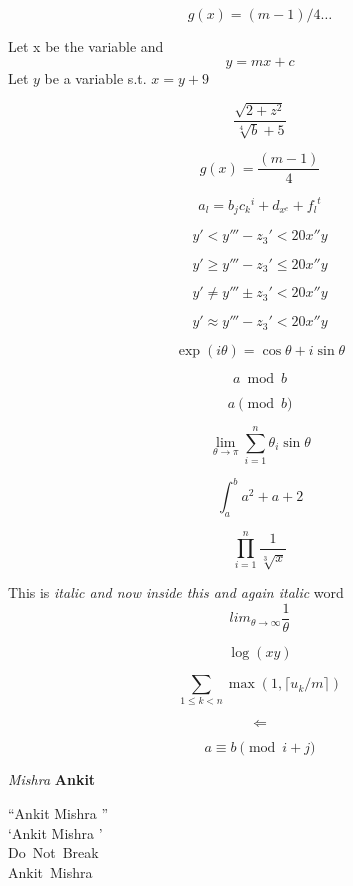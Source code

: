 \documentclass[12pt]{article}
\begin{document}
\begin{equation}
g(x)=(m-1)/4 \ldots
\end{equation}

Let x be the variable and 
$$y=mx+c$$
Let $y$ be a variable s.t. \(x=y+9\)


$$\frac{\sqrt{2+z^2}}{\sqrt[4]{b}+5}$$

$$g(x)=\frac{(m-1)}{4}$$

$$a_l={b_j}{{c_k}^i} + d_{x^e} + {{f_l}^t}$$

$$y' < y''' - {z_3}' < 20x''y $$

$$y' \geq y''' - {z_3}' \leq 20x''y $$

$$y' \neq y''' \pm {z_3}' < 20x''y $$

$$y' \approx y''' - {z_3}' < 20x''y $$


$$\exp(i\theta)=\cos\theta + i\sin\theta$$

$$a \bmod b$$

$$a \pmod{b}$$


$$\lim_{\theta\rightarrow\pi}\sum_{i=1}^{n}{\theta_i}\sin\theta$$

$$\int_a^b  a^2+a+2 $$


$$\prod_{i=1}^{n}{\frac{1}{\sqrt[3]{x}}}$$

\par

This is \emph{italic and now \emph{inside this} and again italic}
 word\\


$$lim_{\theta\rightarrow\infty} {\frac{1}{\theta}}$$

$$\log(xy)$$

$$\sum_{1 \leq k < n} {\max (1,{\lceil u_k / m \rceil})}$$


$$\Leftarrow$$


$$a \equiv b {\pmod{i+j}}$$

\textit{Mishra} \textbf{Ankit}

\textquotedblleft Ankit Mishra \textquotedblright  \\[10mm]
     \textquoteleft Ankit Mishra \textquoteright \\
Do~Not~Break\\
Ankit\ Mishra
\end{document}
